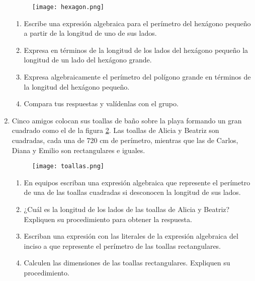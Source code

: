 \begin{enumerate}
          \begin{minipage}{0.25\textwidth}
              \begin{figure}[H]
                  \centering
                  \texttt{[image: hexagon.png]}
                  \label{fig:hexagon}
              \end{figure}
          \end{minipage}\hfill
          \begin{minipage}{0.65\textwidth}
              \begin{enumerate}
                  \item Escribe una expresión algebraica para el perímetro del hexágono pequeño a partir de la longitud de uno de sus lados.
                  \item Expresa en términos de la longitud de los lados del hexágono pequeño la longitud de un lado del hexágono grande.
                  \item Expresa algebraicamente el perímetro del polígono grande en términos de la longitud del hexágono pequeño.
                  \item Compara tus respuestas y valídenlas con el grupo.
              \end{enumerate}
          \end{minipage}

    \item  Cinco amigos colocan sus toallas de baño sobre la playa formando un gran cuadrado como el de la figura \ref{fig:toallas}.
          Las toallas de Alicia y Beatriz son cuadradas, cada
          una de 720 cm de perímetro, mientras que las de Carlos, Diana y Emilio son rectangulares e iguales.
          \begin{minipage}{0.25\textwidth}
              \begin{figure}[H]
                  \centering
                  \texttt{[image: toallas.png]}
                  \label{fig:toallas}
              \end{figure}
          \end{minipage}\hfill
          \begin{minipage}{0.65\textwidth}
              \begin{enumerate}
                  \item En equipos escriban una expresión algebraica que represente el perímetro de una de las toallas cuadradas si desconocen la longitud de sus lados.
                  \item ¿Cuál es la longitud de los lados de las toallas de Alicia y Beatriz? Expliquen su procedimiento para obtener la respuesta.
                  \item Escriban una expresión con las literales de la expresión algebraica del inciso a que represente el perímetro de las toallas rectangulares.
                  \item Calculen las dimensiones de las toallas rectangulares. Expliquen su procedimiento.
              \end{enumerate}
          \end{minipage}


\end{enumerate}
